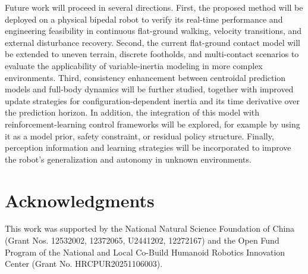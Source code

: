 \documentclass[5p,times]{elsarticle}
\begin{document}
Future work will proceed in several directions. First, the proposed method will be deployed on a physical bipedal robot to verify its real-time performance and engineering feasibility in continuous flat-ground walking, velocity transitions, and external disturbance recovery. Second, the current flat-ground contact model will be extended to uneven terrain, discrete footholds, and multi-contact scenarios to evaluate the applicability of variable-inertia modeling in more complex environments. Third, consistency enhancement between centroidal prediction models and full-body dynamics will be further studied, together with improved update strategies for configuration-dependent inertia and its time derivative over the prediction horizon. In addition, the integration of this model with reinforcement-learning control frameworks will be explored, for example by using it as a model prior, safety constraint, or residual policy structure. Finally, perception information and learning strategies will be incorporated to improve the robot's generalization and autonomy in unknown environments.

\section*{Acknowledgments}
This work was supported by the National Natural Science Foundation of China (Grant Nos. 12532002, 12372065, U2441202, 12272167) and the Open Fund Program of the National and Local Co-Build Humanoid Robotics Innovation Center (Grant No. HRCPUR20251106003).
\end{document}

